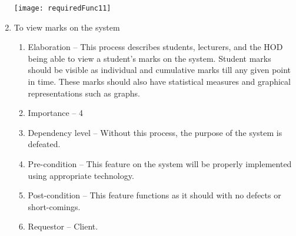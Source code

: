 \documentclass[12pt, a4paper]{scrartcl}
\begin{document}
\begin{enumerate}
\begin{enumerate}
\begin{enumerate}
						\end{enumerate}
					\end{enumerate}
					\texttt{[image: requiredFunc11]}
					\item To view marks on the system
					\begin{enumerate}
					\item Elaboration – This process describes students, lecturers, and the HOD being able to view a student’s marks on the system. Student marks should be visible as individual and cumulative marks till any given point in time. These marks should also have statistical measures and graphical representations such as graphs.
					\item Importance – 4
					\item Dependency level – Without this process, the purpose of the system is defeated.
					\item Pre-condition – This feature on the system will be properly implemented using appropriate technology.
					\item Post-condition – This feature functions as it should with no defects or short-comings.
					\item Requestor – Client.


\end{enumerate}
\end{enumerate}
\end{document}
